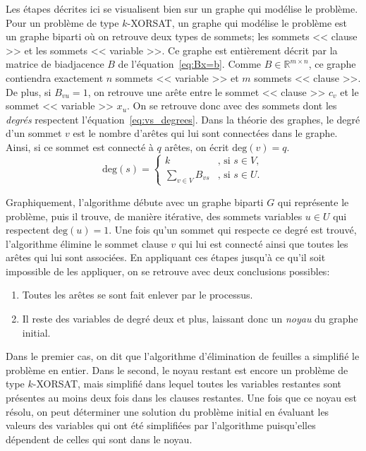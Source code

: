 Les étapes décrites ici se visualisent bien sur un graphe qui modélise le problème.
Pour un problème de type $k$-XORSAT, un graphe qui modélise le problème est un graphe biparti où on retrouve deux types de sommets; les sommets << clause >> et les sommets << variable >>.
Ce graphe est entièrement décrit par la matrice de biadjacence $B$ de l'équation~\ref{eq:Bx=b}.
Comme $B \in \mathbb{R}^{m \times n}$, ce graphe contiendra exactement $n$ sommets << variable >> et $m$ sommets << clause >>.
De plus, si $B_{vu} = 1$, on retrouve une arête entre le sommet << clause >> $c_v$ et le sommet << variable >> $x_u$.
On se retrouve donc avec des sommets dont les \emph{degrés} respectent l'équation~\ref{eq:vs_degrees}.
Dans la théorie des graphes, le degré d'un sommet $v$ est le nombre d'arêtes qui lui sont connectées dans le graphe.
Ainsi, si ce sommet est connecté à $q$ arêtes, on écrit $\mathrm{deg}(v) = q$.
\begin{equation}\label{eq:vs_degrees}
    \mathrm{deg}(s) = \begin{cases}
        k & \text{, si } s \in V,\\
        \sum_{v \in V}B_{vs} & \text{, si } s \in U.
    \end{cases}
\end{equation}

Graphiquement, l'algorithme débute avec un graphe biparti $G$ qui représente le problème, puis il trouve, de manière itérative, des sommets variables $u \in U$ qui respectent $\mathrm{deg}(u) = 1$.
Une fois qu'un sommet qui respecte ce degré est trouvé, l'algorithme élimine le sommet clause $v$ qui lui est connecté ainsi que toutes les arêtes qui lui sont associées.
En appliquant ces étapes jusqu'à ce qu'il soit impossible de les appliquer, on se retrouve avec deux conclusions possibles:
\begin{enumerate}
    \item Toutes les arêtes se sont fait enlever par le processus.
    \item Il reste des variables de degré deux et plus, laissant donc un \emph{noyau} du graphe initial.
\end{enumerate}
Dans le premier cas, on dit que l'algorithme d'élimination de feuilles a simplifié le problème en entier.
Dans le second, le noyau restant est encore un problème de type $k$-XORSAT, mais simplifié dans lequel toutes les variables restantes sont présentes au moins deux fois dans les clauses restantes.
Une fois que ce noyau est résolu, on peut déterminer une solution du problème initial en évaluant les valeurs des variables qui ont été simplifiées par l'algorithme puisqu'elles dépendent de celles qui sont dans le noyau. 

